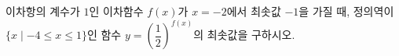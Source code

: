 이차항의 계수가 $1$인 이차함수 $f(x)$가 $x=-2$에서 최솟값 $-1$을 가질 때, 정의역이 $\{x \mid -4\le x\le 1\}$인 함수 $y=\left(\dfrac{1}{2}\right)^{f(x)}$의 최솟값을 구하시오.

